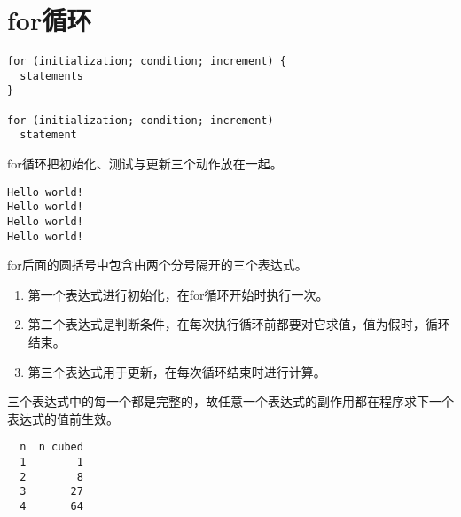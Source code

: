\section{for循环}
\begin{frame}[fragile]\ft{\secname}
\begin{lstlisting}
for (initialization; condition; increment) {
  statements
}

for (initialization; condition; increment) 
  statement
\end{lstlisting} 

for循环把初始化、测试与更新三个动作放在一起。

\end{frame}


\begin{frame}[fragile]\ft{\secname}

\end{frame}


\begin{frame}[fragile]\ft{\secname}
\begin{lstlisting}
Hello world!
Hello world!
Hello world!
Hello world!
\end{lstlisting} 
\end{frame}


\begin{frame}[fragile]\ft{\secname}
for后面的圆括号中包含由两个分号隔开的三个表达式。\vspace{0.1in}

\begin{enumerate}
\item 第一个表达式进行初始化，在for循环开始时执行一次。\\[0.1in]
\item 第二个表达式是判断条件，在每次执行循环前都要对它求值，值为假时，循环结束。\\[0.1in]
\item 第三个表达式用于更新，在每次循环结束时进行计算。\\[0.1in]
\end{enumerate}
三个表达式中的每一个都是完整的，故任意一个表达式的副作用都在程序求下一个表达式的值前生效。
\end{frame}

\begin{frame}[fragile]\ft{\secname}

\end{frame}

\begin{frame}[fragile]\ft{\secname}

\begin{lstlisting}
  n  n cubed
  1        1
  2        8
  3       27
  4       64
\end{lstlisting}
\end{frame}

